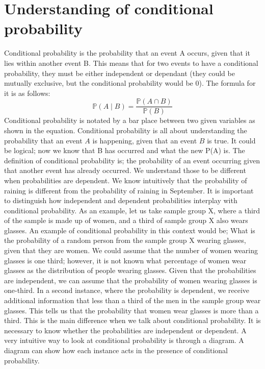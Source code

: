 \documentclass{article}
\begin{document}
\section*{Understanding of conditional probability}
Conditional probability is the probability that an event A occurs, given that it lies within another event B. This means that for two events to have a conditional probability, they must be either independent or dependant (they could be mutually exclusive, but the conditional probability would be 0). The formula for it is as follows:
\begin{equation}
    \mathbb{P}(A \mid B)=\frac{\mathbb{P}(A \cap B)}{\mathbb{P}(B)}
\end{equation}
Conditional probability is notated by a bar place between two given variables as shown in the equation. Conditional probability is all about understanding the probability that an event $A$ is happening, given that an event $B$ is true. It could be logical; now we know that B has occurred and what the new P(A) is. The definition of conditional probability is; the probability of an event occurring given that another event has already occurred. We understand those to be different when probabilities are dependent. We know intuitively that the probability of raining is different from the probability of raining in September. It is important to distinguish how independent and dependent probabilities interplay with conditional probability. As an example, let us take sample group X, where a third of the sample is made up of women, and a third of sample group X also wears glasses. An example of conditional probability in this context would be; What is the probability of a random person from the sample group X wearing glasses, given that they are women. We could assume that the number of women wearing glasses is one third; however, it is not known what percentage of women wear glasses as the distribution of people wearing glasses. Given that the probabilities are independent, we can assume that the probability of women wearing glasses is one-third. In a second instance, where the probability is dependent, we receive additional information that less than a third of the men in the sample group wear glasses. This tells us that the probability that women wear glasses is more than a third. This is the main difference when we talk about conditional probability. It is necessary to know whether the probabilities are independent or dependent. A very intuitive way to look at conditional probability is through a diagram. A diagram can show how each instance acts in the presence of conditional probability.
\end{document}
